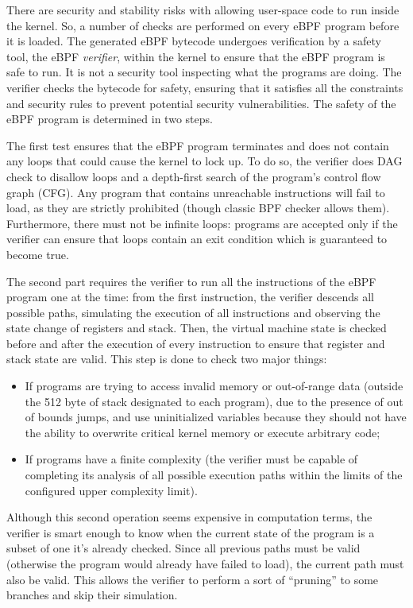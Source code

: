 There are security and stability risks with allowing user-space code to run inside the kernel. 
So, a number of checks are performed on every eBPF program before it is loaded. 
The generated eBPF bytecode undergoes verification by a safety tool, the eBPF \textit{verifier}, within the kernel to ensure that the eBPF program is safe to run.
It is not a security tool inspecting what the programs are doing.
The verifier checks the bytecode for safety, ensuring that it satisfies all the constraints and security rules to prevent potential security vulnerabilities.
The safety of the eBPF program is determined in two steps.

The first test ensures that the eBPF program terminates and does not contain any loops that could cause the kernel to lock up. 
To do so, the verifier does DAG check to disallow loops and a depth-first search of the program's control flow graph (CFG). 
Any program that contains unreachable instructions will fail to load, as they are strictly prohibited (though classic BPF checker allows them).
Furthermore, there must not be infinite loops: programs are accepted only if the verifier can ensure that loops contain an exit condition which is guaranteed to become true.

The second part requires the verifier to run all the instructions of the eBPF program one at the time: from the first instruction, the verifier descends all possible paths, simulating the execution of all instructions and observing the state change of registers and stack.
Then, the virtual machine state is checked before and after the execution of every instruction to ensure that register and stack state are valid. 
This step is done to check two major things: 

\begin{itemize}
	\item If programs are trying to access invalid memory or out-of-range data
		(outside the 512 byte of stack designated to each program), due to	the presence of out of bounds jumps, and use uninitialized variables because they should not have the ability to overwrite critical kernel memory or execute arbitrary code;
	\item If programs have a finite complexity (the verifier must be capable of
		completing its analysis of all possible execution paths within the limits of the configured upper complexity limit).
\end{itemize}

Although this second operation seems expensive in computation terms, the verifier is smart enough to know when the current state of the program is a subset of one it's already checked. 
Since all previous paths must be valid (otherwise the program would already have failed to load), the current path must also be valid. 
This allows the verifier to perform a sort of ``pruning'' to some branches and skip their simulation.

